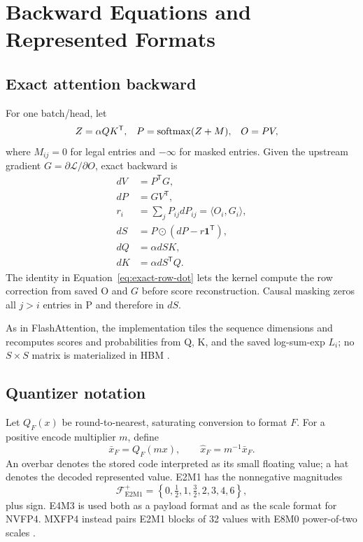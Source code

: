 \section{Backward Equations and Represented Formats}

\subsection{Exact attention backward}

For one batch/head, let
\begin{align}
  Z &= \alpha QK^\mathsf{T}, &
  P &= \operatorname{softmax}(Z+M), &
  O &= PV,
  \label{eq:exact-forward}
\end{align}
where $M_{ij}=0$ for legal entries and $-\infty$ for masked entries.  Given
the upstream gradient $G=\partial\mathcal L/\partial O$, exact backward is
\begin{align}
  dV &= P^\mathsf{T}G, \label{eq:exact-dv}\\
  dP &= GV^\mathsf{T}, \label{eq:exact-dp}\\
  r_i &= \sum_j P_{ij}dP_{ij}
       = \langle O_i,G_i\rangle, \label{eq:exact-row-dot}\\
  dS &= P\odot(dP-r\mathbf 1^\mathsf{T}), \label{eq:exact-ds}\\
  dQ &= \alpha dS K, \label{eq:exact-dq}\\
  dK &= \alpha dS^\mathsf{T}Q. \label{eq:exact-dk}
\end{align}
The identity in Equation~\ref{eq:exact-row-dot} lets the kernel compute the
row correction from saved O and $G$ before score reconstruction.  Causal
masking zeros all $j>i$ entries in P and therefore in $dS$.

As in FlashAttention, the implementation tiles the sequence dimensions and
recomputes scores and probabilities from Q, K, and the saved log-sum-exp
$L_i$; no $S\times S$ matrix is materialized in HBM
\cite{dao2022flashattention,zadouri2026flashattention4}.

\subsection{Quantizer notation}

Let $Q_F(x)$ be round-to-nearest, saturating conversion to format $F$.  For a
positive encode multiplier $m$, define
\begin{equation}
  \bar x_F = Q_F(mx),\qquad
  \widehat x_F=m^{-1}\bar x_F.
  \label{eq:quantizer-notation}
\end{equation}
An overbar denotes the stored code interpreted as its small floating value;
a hat denotes the decoded represented value.  E2M1 has the nonnegative
magnitudes
\begin{equation}
  \mathcal F_{\mathrm{E2M1}}^+
  =\left\{0,\tfrac12,1,\tfrac32,2,3,4,6\right\},
  \label{eq:e2m1-values}
\end{equation}
plus sign.  E4M3 is used both as a payload format and as the scale format for
NVFP4.  MXFP4 instead pairs E2M1 blocks of 32 values with E8M0 power-of-two
scales \cite{ocp2023mx,nvidia2025nvfp4}.

